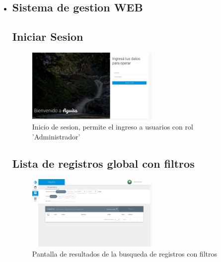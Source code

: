 \begin{itemize}
			\item \subsection{Sistema de gestion WEB}

				\subsection{Iniciar Sesion}
					\begin{figure}
						\centering
							\includegraphics[width=0.6\textwidth]{Screenshots/web/login.png}
									\caption{Inicio de sesion, permite el ingreso a usuarios con rol 'Administrador'}
							\label{fig:login}
					\end{figure}

				\subsection{Lista de registros global con filtros}
					\begin{figure}
						\centering
							\includegraphics[width=0.6\textwidth]{Screenshots/web/registroListar.png}
									\caption{Pantalla de resultados de la busqueda de registros con filtros}
							\label{fig:busqueda}
					\end{figure}


\end{itemize}
